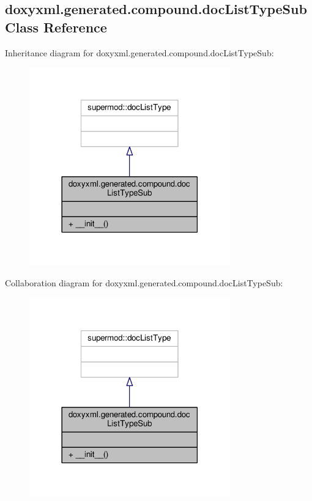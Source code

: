 \subsection{doxyxml.\+generated.\+compound.\+doc\+List\+Type\+Sub Class Reference}
\label{classdoxyxml_1_1generated_1_1compound_1_1docListTypeSub}


Inheritance diagram for doxyxml.\+generated.\+compound.\+doc\+List\+Type\+Sub\+:
\nopagebreak
\begin{figure}[H]
\begin{center}
\leavevmode
\includegraphics[width=246pt]{dc/d26/classdoxyxml_1_1generated_1_1compound_1_1docListTypeSub__inherit__graph}
\end{center}
\end{figure}


Collaboration diagram for doxyxml.\+generated.\+compound.\+doc\+List\+Type\+Sub\+:
\nopagebreak
\begin{figure}[H]
\begin{center}
\leavevmode
\includegraphics[width=246pt]{d6/d5c/classdoxyxml_1_1generated_1_1compound_1_1docListTypeSub__coll__graph}
\end{center}
\end{figure}
